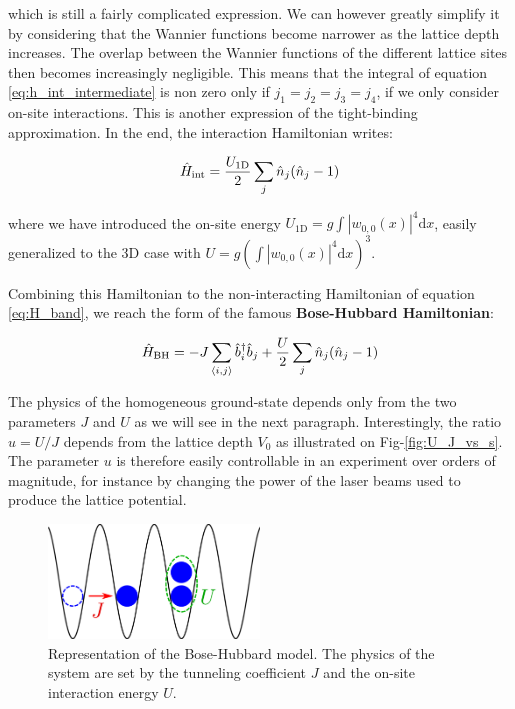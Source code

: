 \noindent which is still a fairly complicated expression. We can however greatly simplify it by considering that the Wannier functions become narrower as the lattice depth increases. The overlap between the Wannier functions of the different lattice sites then becomes increasingly negligible. This means that the integral of equation \ref{eq:h_int_intermediate} is non zero only if $j_1=j_2=j_3=j_4$, \ie if we only consider on-site interactions. This is another expression of the tight-binding approximation. In the end, the interaction Hamiltonian writes:

\begin{equation}
    \hat{H}_{\rm{int}}=\frac{U_{\mathrm{1D}}}{2} \sum_j \hat{n}_j (\hat{n}_j -1)
\end{equation}

\noindent where we have introduced the on-site energy $U_{\mathrm{1D}}=g \int\left|w_{0,0}(x)\right|^{4} \mathrm{d}x$, easily generalized to the 3D case with $U=g (\int\left|w_{0,0}(x)\right|^{4} \mathrm{d}x)^3$. 

Combining this Hamiltonian to the non-interacting Hamiltonian of equation \ref{eq:H_band}, we reach the form of the famous \textbf{Bose-Hubbard Hamiltonian}:

\begin{equation}
    \hat{H}_{\mathrm{BH}}= -J \sum_{\langle i,j\rangle} \hat{b}^{\dagger}_i \hat{b}_j + \frac{U}{2} \sum_j \hat{n}_j (\hat{n}_j -1)
\end{equation}

\noindent The physics of the homogeneous ground-state depends only from the two parameters $J$ and $U$ as we will see in the next paragraph. Interestingly, the ratio $u=U/J$ depends from the lattice depth $V_0$ as illustrated on Fig-\ref{fig:U_J_vs_s}. The parameter $u$ is therefore easily controllable in an experiment over orders of magnitude, for instance by changing the power of the laser beams used to produce the lattice potential. 

\begin{figure}
    \centering
    \includegraphics[width=0.5\textwidth]{Fig/Chapter2/illu_bose_hubbard.png}
    \caption[Representation of the Bose-Hubbard model]{Representation of the Bose-Hubbard model. The physics of the system are set by the tunneling coefficient $J$ and the on-site interaction energy $U$.}
    \label{fig:my_label}
\end{figure}

